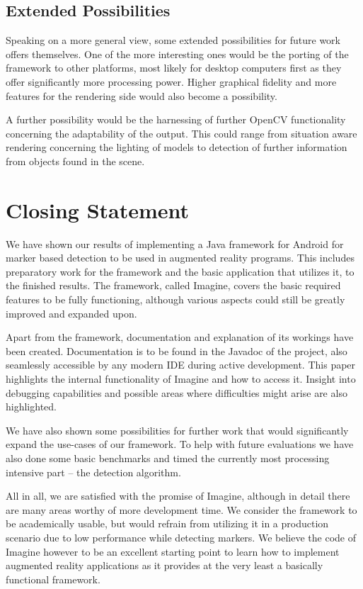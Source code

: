 \subsection{Extended Possibilities}

Speaking on a more general view, some extended possibilities for future work offers themselves.
One of the more interesting ones would be the porting of the framework to other platforms, most likely for desktop computers first as they offer significantly more processing power.
Higher graphical fidelity and more features for the rendering side would also become a possibility.

A further possibility would be the harnessing of further OpenCV functionality concerning the adaptability of the output.
This could range from situation aware rendering concerning the lighting of models to detection of further information from objects found in the scene.

\section{Closing Statement}

We have shown our results of implementing a Java framework for Android for marker based detection to be used in augmented reality programs.
This includes preparatory work for the framework and the basic application that utilizes it, to the finished results.
The framework, called Imagine, covers the basic required features to be fully functioning, although various aspects could still be greatly improved and expanded upon.

Apart from the framework, documentation and explanation of its workings have been created.
Documentation is to be found in the Javadoc of the project, also seamlessly accessible by any modern IDE during active development.
This paper highlights the internal functionality of Imagine and how to access it.
Insight into debugging capabilities and possible areas where difficulties might arise are also highlighted.

We have also shown some possibilities for further work that would significantly expand the use-cases of our framework.
To help with future evaluations we have also done some basic benchmarks and timed the currently most processing intensive part – the detection algorithm.

All in all, we are satisfied with the promise of Imagine, although in detail there are many areas worthy of more development time.
We consider the framework to be academically usable, but would refrain from utilizing it in a production scenario due to low performance while detecting markers.
We believe the code of Imagine however to be an excellent starting point to learn how to implement augmented reality applications as it provides at the very least a basically functional framework.
